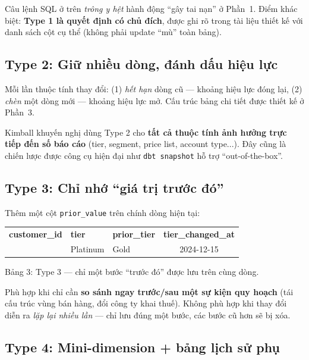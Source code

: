 \documentclass[12pt]{article}
\begin{document}
\begin{notebox}
Câu lệnh SQL ở trên \emph{trông y hệt} hành động ``gây tai nạn'' ở Phần~1. Điểm khác biệt: \textbf{Type 1 là quyết định có chủ đích}, được ghi rõ trong tài liệu thiết kế với danh sách cột cụ thể (không phải update ``mù'' toàn bảng).
\end{notebox}

\subsection{Type 2: Giữ nhiều dòng, đánh dấu hiệu lực}

Mỗi lần thuộc tính thay đổi: (1) \emph{hết hạn} dòng cũ --- khoảng hiệu lực đóng lại, (2) \emph{chèn} một dòng mới --- khoảng hiệu lực mở. Cấu trúc bảng chi tiết được thiết kế ở Phần~3.

Kimball khuyến nghị dùng Type 2 cho \textbf{tất cả thuộc tính ảnh hưởng trực tiếp đến số báo cáo} (tier, segment, price list, account type...). Đây cũng là chiến lược được công cụ hiện đại như \texttt{dbt snapshot} hỗ trợ ``out-of-the-box''.

\subsection{Type 3: Chỉ nhớ ``giá trị trước đó''}

Thêm một cột \texttt{prior\_value} trên chính dòng hiện tại:

\noindent
\begin{longtable}{@{}c>{\RaggedRight\arraybackslash}p{3.4cm}>{\RaggedRight\arraybackslash}p{4.0cm}c@{}}
\rowcolor{rowLavender}
\textbf{customer\_id} & \textbf{tier} & \textbf{prior\_tier} & \textbf{tier\_changed\_at} \\
\addlinespace[3pt]
\endhead
102 & Platinum & Gold & 2024-12-15 \\
\end{longtable}

\begin{captionbelowboxaivn}
Bảng 3: Type 3 --- chỉ một bước ``trước đó'' được lưu trên cùng dòng.
\end{captionbelowboxaivn}

Phù hợp khi chỉ cần \textbf{so sánh ngay trước/sau một sự kiện quy hoạch} (tái cấu trúc vùng bán hàng, đổi công ty khai thuế). Không phù hợp khi thay đổi diễn ra \emph{lặp lại nhiều lần} --- chỉ lưu đúng một bước, các bước cũ hơn sẽ bị xóa.

\subsection{Type 4: Mini-dimension + bảng lịch sử phụ}
\end{document}

